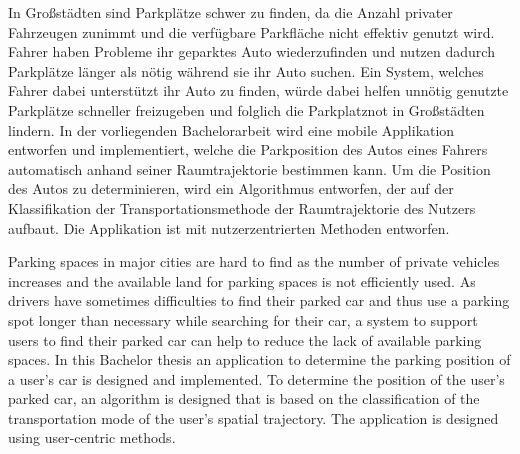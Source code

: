 \begin{abstractDE}

In Großstädten sind Parkplätze schwer zu finden, da die Anzahl privater Fahrzeugen zunimmt und die verfügbare Parkfläche nicht effektiv genutzt wird. Fahrer haben Probleme ihr geparktes Auto wiederzufinden und nutzen dadurch Parkplätze länger als nötig während sie ihr Auto suchen. Ein System, welches Fahrer dabei unterstützt ihr Auto zu finden, würde dabei helfen unnötig genutzte Parkplätze schneller freizugeben und folglich die Parkplatznot in Großstädten lindern. In der vorliegenden Bachelorarbeit wird eine mobile Applikation entworfen und implementiert, welche die Parkposition des Autos eines Fahrers automatisch anhand seiner Raumtrajektorie bestimmen kann. Um die Position des Autos zu determinieren, wird ein Algorithmus entworfen, der auf der Klassifikation der Transportationsmethode der Raumtrajektorie des Nutzers aufbaut. Die Applikation ist mit nutzerzentrierten Methoden entworfen.

\end{abstractDE}

\vfill

\begin{abstractEN}

Parking spaces in major cities are hard to find as the number of private vehicles increases and the available land for parking spaces is not efficiently used. As drivers have sometimes difficulties to find their parked car and thus use a parking spot longer than necessary while searching for their car, a system to support users to find their parked car can help to reduce the lack of available parking spaces. In this Bachelor thesis an application to determine the parking position of a user's car is designed and implemented. To determine the position of the user's parked car, an algorithm is designed that is based on the classification of the transportation mode of the user's spatial trajectory. The application is designed using user-centric methods. 

\end{abstractEN}

\vfill